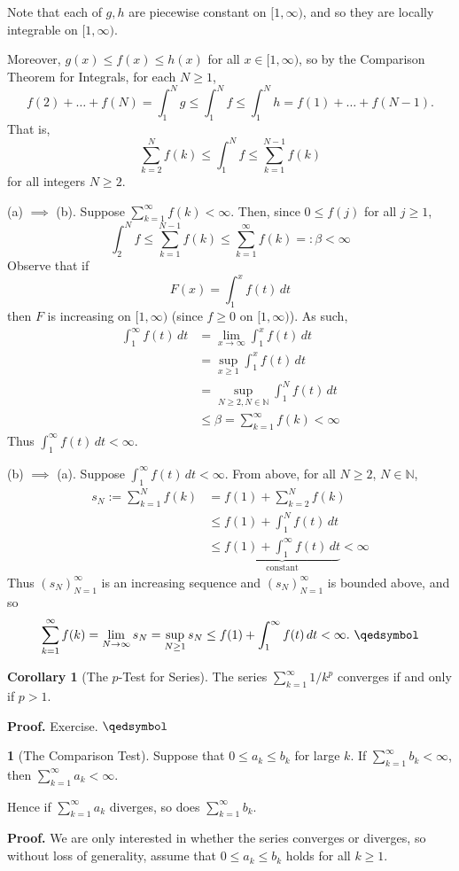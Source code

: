 \documentclass[11pt]{article}
\theoremstyle{definition}
\newtheorem{cor}[thm]{Corollary}
\newtheorem{none}[thm]{}
\newcommand{\mbN}{\ensuremath{\mathbb{N}}}
\begin{document}
Note that each of $g, h$ are piecewise constant on $[1, \infty)$, and so they are locally integrable on $[1, \infty)$. 

Moreover, $g(x) \leq f(x) \leq h(x)$ for all $x \in [1, \infty)$, so by the Comparison Theorem for Integrals, for each $N \geq 1$,
$$f(2) + \dots + f(N) = \int_1^N g \leq \int_1^N f \leq \int_1^N h = f(1) + \dots + f(N-1).$$
That is,
$$\sum_{k=2}^N f(k) \leq \int_1^N f \leq \sum_{k=1}^{N-1} f(k)$$
for all integers $N \geq 2$. 

(a) $\implies$ (b). Suppose $\sum_{k=1}^\infty f(k) < \infty$. Then, since $0 \leq f(j)$ for all $j \geq 1$,
$$\int_2^N f \leq \sum_{k=1}^{N-1} f(k) \leq \sum_{k=1}^\infty f(k) =: \beta < \infty$$
Observe that if 
$$F(x) = \int_1^x f(t) \, dt$$
then $F$ is increasing on $[1, \infty)$ (since $f \geq 0$ on $[1, \infty)$). As such,
\begin{align*}
\int_1^\infty f(t)\,dt & = \lim_{x\to\infty} \int_1^x f(t)\,dt \\
& = \sup_{x \geq 1} \int_1^x f(t)\,dt \\
& = \sup_{N\geq2, N\in\mbN} \int_1^N f(t)\,dt \\
& \leq \beta = \sum_{k=1}^\infty f(k) < \infty
\end{align*}
Thus $\int_1^\infty f(t)\,dt < \infty$. 

(b) $\implies$ (a). Suppose $\int_1^\infty f(t)\,dt < \infty$. From above, for all $N \geq 2$, $N \in \mbN$,
\begin{align*}
s_N := \sum_{k=1}^N f(k) & = f(1) + \sum_{k=2}^N f(k) \\
& \leq f(1) + \int_1^N f(t)\,dt \\
& \leq \underbrace{f(1) + \int_1^\infty f(t)\,dt}_{\text{constant}} < \infty
\end{align*}
Thus $(s_N)_{N=1}^\infty$ is an increasing sequence and $(s_N)_{N=1}^\infty$ is bounded above, and so
$$\sum_{k=1}^\infty f(k) = \lim_{N\to\infty} s_N = \sup_{N\geq1} s_N \leq f(1) + \int_1^\infty f(t)\,dt < \infty. \text{ } \qedsymbol$$

\begin{cor}[The $p$-Test for Series]
The series $\sum_{k=1}^\infty 1/k^p$ converges if and only if $p > 1$.
\end{cor}
\textbf{\small Proof.} Exercise. $\qedsymbol$

\begin{none}[The Comparison Test]
Suppose that $0 \leq a_k \leq b_k$ for large $k$. If $\sum_{k=1}^\infty b_k < \infty$, then $\sum_{k=1}^\infty a_k < \infty$. 

Hence if $\sum_{k=1}^\infty a_k$ diverges, so does $\sum_{k=1}^\infty b_k$.
\end{none}
\textbf{\small Proof.} We are only interested in whether the series converges or diverges, so without loss of generality, assume that $0 \leq a_k \leq b_k$ holds for all $k \geq 1$. 
\end{document}
